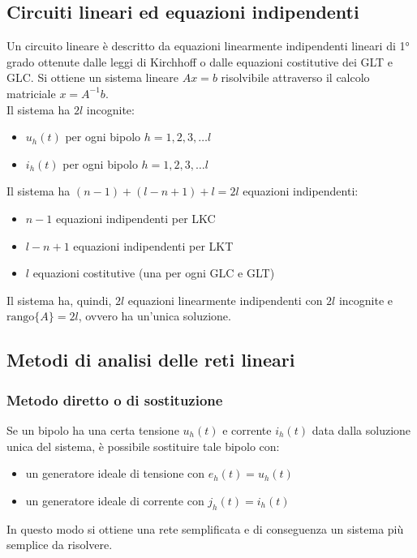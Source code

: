 \documentclass[a4paper]{article}
\begin{document}
\subsection{Circuiti lineari ed equazioni indipendenti}
Un circuito lineare è descritto da equazioni linearmente indipendenti lineari di 1° grado ottenute dalle leggi di Kirchhoff o
dalle equazioni costitutive dei GLT e GLC. Si ottiene un sistema lineare \(A x = b\) risolvibile attraverso il calcolo
matriciale \(x = A^{-1} b\). \\
Il sistema ha \(2l\) incognite:
\begin{itemize}
	\item \(u_h(t)\) per ogni bipolo \(h = 1,2,3, \dots l\)
	\item \(i_h(t)\) per ogni bipolo \(h = 1,2,3, \dots l\)
\end{itemize}
Il sistema ha \((n-1) + (l-n+1) + l = 2l\) equazioni indipendenti:
\begin{itemize}
	\item \(n-1\) equazioni indipendenti per LKC
	\item \(l-n+1\) equazioni indipendenti per LKT
	\item \(l\) equazioni costitutive (una per ogni GLC e GLT)
\end{itemize}
Il sistema ha, quindi, \(2l\) equazioni linearmente indipendenti con \(2l\) incognite e \(\text{rango}\{A\} = 2l\), ovvero ha
un'unica soluzione.

\subsection{Metodi di analisi delle reti lineari}
\subsubsection*{Metodo diretto o di sostituzione}
Se un bipolo ha una certa tensione \(u_h(t)\) e corrente \(i_h(t)\) data dalla soluzione unica del sistema, è possibile sostituire
tale bipolo con:
\begin{itemize}
	\item un generatore ideale di tensione con \(e_h(t) = u_h(t)\)
	\item un generatore ideale di corrente con \(j_h(t) = i_h(t)\)
\end{itemize}
In questo modo si ottiene una rete semplificata e di conseguenza un sistema più semplice da risolvere.
\end{document}
